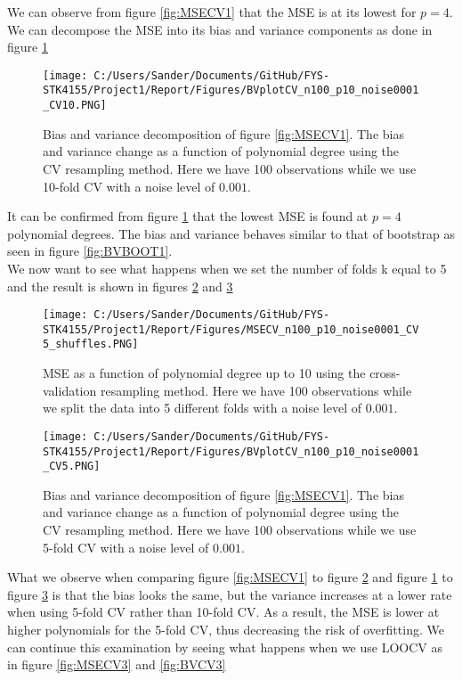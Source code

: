 \documentclass[12pt,a4paper]{article}
\begin{document}
\noindent We can observe from figure \ref{fig:MSECV1} that the MSE is at its lowest for $p = 4$. We can decompose the MSE into its bias and variance components as done in figure \ref{fig:BVCV1}

\begin{figure}[H]
\centering
\texttt{[image: C:/Users/Sander/Documents/GitHub/FYS-STK4155/Project1/Report/Figures/BVplotCV\_n100\_p10\_noise0001\_CV10.PNG]}
\caption{\label{fig:BVCV1} Bias and variance decomposition of figure \ref{fig:MSECV1}. The bias and variance change as a function of polynomial degree using the CV resampling method. Here we have 100 observations while we use 10-fold CV with a noise level of $0.001$.}
\end{figure}

\noindent It can be confirmed from figure \ref{fig:BVCV1} that the lowest MSE is found at $p = 4$ polynomial degrees. The bias and variance behaves similar to that of bootstrap as seen in figure \ref{fig:BVBOOT1}. 
\\
We now want to see what happens when we set the number of folds k equal to 5 and the result is shown in figures \ref{fig:MSECV2} and \ref{fig:BVCV2}

\begin{figure}[H]
\centering
\texttt{[image: C:/Users/Sander/Documents/GitHub/FYS-STK4155/Project1/Report/Figures/MSECV\_n100\_p10\_noise0001\_CV5\_shuffles.PNG]}
\caption{\label{fig:MSECV2} MSE as a function of polynomial degree up to 10 using the cross-validation resampling method. Here we have 100 observations while we split the data into 5 different folds with a noise level of $0.001$.}
\end{figure}

\begin{figure}[H]
\centering
\texttt{[image: C:/Users/Sander/Documents/GitHub/FYS-STK4155/Project1/Report/Figures/BVplotCV\_n100\_p10\_noise0001\_CV5.PNG]}
\caption{\label{fig:BVCV2} Bias and variance decomposition of figure \ref{fig:MSECV1}. The bias and variance change as a function of polynomial degree using the CV resampling method. Here we have 100 observations while we use 5-fold CV with a noise level of $0.001$.}
\end{figure}

\noindent What we observe when comparing figure \ref{fig:MSECV1} to figure \ref{fig:MSECV2} and figure \ref{fig:BVCV1} to figure \ref{fig:BVCV2} is that the bias looks the same, but the variance increases at a lower rate when using 5-fold CV rather than 10-fold CV. As a result, the MSE is lower at higher polynomials for the 5-fold CV, thus decreasing the risk of overfitting. We can continue this examination by seeing what happens when we use LOOCV as in figure \ref{fig:MSECV3} and \ref{fig:BVCV3}
\end{document}
